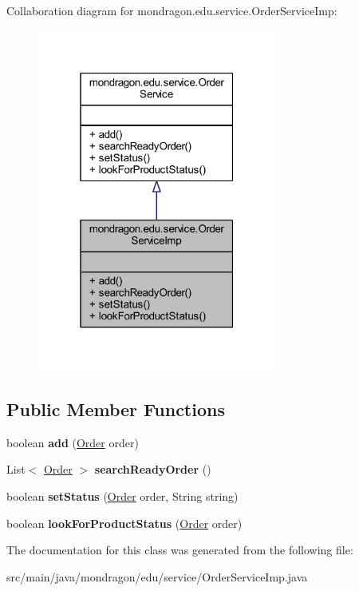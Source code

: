 Collaboration diagram for mondragon.\+edu.\+service.\+Order\+Service\+Imp\+:\nopagebreak
\begin{figure}[H]
\begin{center}
\leavevmode
\includegraphics[width=223pt]{classmondragon_1_1edu_1_1service_1_1_order_service_imp__coll__graph}
\end{center}
\end{figure}
\subsection*{Public Member Functions}
\begin{DoxyCompactItemize}
\item 
\mbox{\label{classmondragon_1_1edu_1_1service_1_1_order_service_imp_a0a1bc2b2f5b8b9c1c6915526fa16d79a}} 
boolean {\bfseries add} (\mbox{\hyperlink{classmondragon_1_1edu_1_1clases_1_1_order}{Order}} order)
\item 
\mbox{\label{classmondragon_1_1edu_1_1service_1_1_order_service_imp_ae99f4ea79f27738890fbf0a7e3cc428d}} 
List$<$ \mbox{\hyperlink{classmondragon_1_1edu_1_1clases_1_1_order}{Order}} $>$ {\bfseries search\+Ready\+Order} ()
\item 
\mbox{\label{classmondragon_1_1edu_1_1service_1_1_order_service_imp_ab2b1a1c27ff639ac96947cb14d172169}} 
boolean {\bfseries set\+Status} (\mbox{\hyperlink{classmondragon_1_1edu_1_1clases_1_1_order}{Order}} order, String string)
\item 
\mbox{\label{classmondragon_1_1edu_1_1service_1_1_order_service_imp_a7ffb4725f619f4b0fa3aeec35a1a748f}} 
boolean {\bfseries look\+For\+Product\+Status} (\mbox{\hyperlink{classmondragon_1_1edu_1_1clases_1_1_order}{Order}} order)
\end{DoxyCompactItemize}


The documentation for this class was generated from the following file\+:\begin{DoxyCompactItemize}
\item 
src/main/java/mondragon/edu/service/Order\+Service\+Imp.\+java\end{DoxyCompactItemize}
